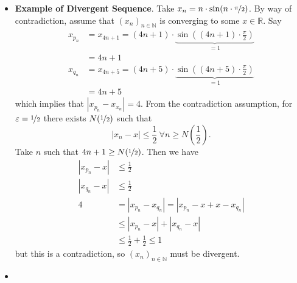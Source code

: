 \documentclass{article}
\newcommand{\R}{\mathbb{R}}
\newcommand{\N}{\mathbb{N}}
\newcommand{\seq}[2]{(#1_{#2})_{#2 \in \N}}
\newcommand{\?}{\stackrel{?}{=}}
\theoremstyle{definition} %
\begin{document}
\begin{itemize}
\begin{proof}
              \begin{align*}
                  |l_1 - l_2| & = |l_1 - x_n + x_n - l_2|                       \\
                              & \leq |l_1 - x_n| + |l_2 - x_n| \leq \varepsilon
              \end{align*}
              where $|l_1 - x_n| \leq \varepsilon_1 \ \forall n \geq N_1$ and $|l_2 - x_n| \leq \varepsilon_2 \  n \geq N_2 \ n \geq \max\{N_1, N_2\}$. Altogether, this implies that $l_1 = l_2$.
          \end{proof}
    \item \textbf{Example of Divergent Sequence}. Take $x_n = n \cdot \sin(n \cdot \nicefrac{\pi}{2})$. By way of contradiction, assume that $\seq{x}{n}$ is converging to some $x \in \R$. Say
          \begin{align*}
              x_{p_n} & = x_{4n + 1} = (4n + 1) \cdot \underbrace{\sin((4n + 1) \cdot \frac{\pi}{2})}_{= 1} \\
                      & = 4n + 1                                                                            \\
              x_{q_n} & = x_{4n + 5} = (4n + 5) \cdot \underbrace{\sin((4n + 5) \cdot \frac{\pi}{2})}_{= 1} \\
                      & = 4n + 5
          \end{align*}
          which implies that $|x_{p_n} - x_{x_n}| = 4$. From the contradiction assumption, for $\varepsilon = \nicefrac{1}{2}$ there exists $N(\nicefrac{1}{2})$ such that
          $$|x_n - x| \leq \frac{1}{2} \ \forall n \geq N(\frac{1}{2}).$$
          Take $n$ such that $4n + 1 \geq N(\nicefrac{1}{2})$. Then we have
          \begin{align*}
              |x_{p_n} - x| & \leq \frac{1}{2}                                    \\
              |x_{q_n} - x| & \leq \frac{1}{2}                                    \\
              4             & = |x_{p_n} - x_{q_n}| = |x_{p_n} - x + x - x_{q_n}| \\
                            & \leq |x_{p_n} - x| + |x_{q_n} - x|                  \\
                            & \leq \frac{1}{2} + \frac{1}{2} \leq 1
          \end{align*}
          but this is a contradiction, so $\seq{x}{n}$ must be divergent.
    \item[]
          \begin{lemma}

\end{lemma}
\end{itemize}
\end{document}
